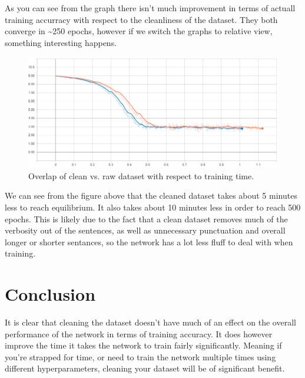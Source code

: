 \documentclass[titlepage]{article}
\begin{document}
As you can see from the graph there isn't much improvement in terms of actuall training accurracy with respect to the cleanliness of the dataset. They both converge in \textasciitilde 250 epochs, however if we switch the graphs to relative view, something interesting happens.
\begin{figure}[H]
	\centering
	\includegraphics[width=120mm]{images/cost-overlap-relative-001.png}
	\caption{Overlap of clean vs. raw dataset with respect to training time.}
	\label{fig:cor001}
\end{figure} 
We can see from the figure above that the cleaned dataset takes about 5 minutes less to reach equilibrium. It also takes about 10 minutes less in order to reach 500 epochs. This is likely due to the fact that a clean dataset removes much of the verbosity out of the sentences, as well as unnecessary punctuation and overall longer or shorter sentances, so the network has a lot less fluff to deal with when training. 
\newpage
\section{Conclusion}
It is clear that cleaning the dataset doesn't have much of an effect on the overall performance of the network in terms of training accuracy. It does however improve the time it takes the network to train fairly significantly. Meaning if you're strapped for time, or need to train the network multiple times using different hyperparameters, cleaning your dataset will be of significant benefit.
\end{document}
